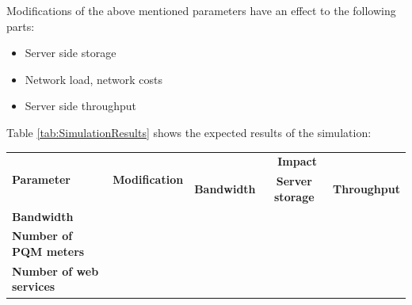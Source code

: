 Modifications of the above mentioned parameters have an effect to the following parts:

\begin{itemize}
	\item Server side storage
	\item Network load, network costs
	\item Server side throughput
\end{itemize}

Table \ref{tab:SimulationResults} shows the expected results of the simulation:

\begin{table}[h]
\centering
\begin{tabular}{l|c|c|c|c}
\hline
\multicolumn{1}{l|}{\multirow{2}{*}{\textbf{Parameter}}} & \multicolumn{1}{c|}{\multirow{2}{*}{\textbf{Modification}}} & \multicolumn{3}{c}{\textbf{Impact}}                                                                                                  \\ \cline{3-5} 
\multicolumn{1}{c|}{} & \multicolumn{1}{c|}{}  & \multicolumn{1}{c|}{\textbf{Bandwidth}} & \multicolumn{1}{c|}{\textbf{Server storage}} & \multicolumn{1}{c}{\textbf{Throughput}} \\ \hline \hline
\multirow{2}{*}{\textbf{Bandwidth}} & \cellcolor{green} & \cellcolor{green} &\cellcolor{yellow}&\cellcolor{yellow}\\
\cline{2-5} 
                                                         & \cellcolor{red}                                                           & \cellcolor{red}                                       &\cellcolor{yellow}                                                &\cellcolor{yellow}                                      \\ \hline
\multirow{2}{*}{\textbf{Number of PQM meters}}           & \cellcolor{green}                                                           & \cellcolor{green}                                       & \cellcolor{green}                                                 & \cellcolor{red}                                       \\ \cline{2-5} 
                                                         & \cellcolor{red}                                                           & \cellcolor{red}                                       & \cellcolor{red}                                                 & \cellcolor{green}                                       \\ \hline
\multirow{2}{*}{\textbf{Number of web services}}          & \cellcolor{green}                                                           &\cellcolor{yellow}                                      &\cellcolor{yellow}                                                & \cellcolor{green}                                       \\ \cline{2-5} 

\end{tabular}
\end{table}
